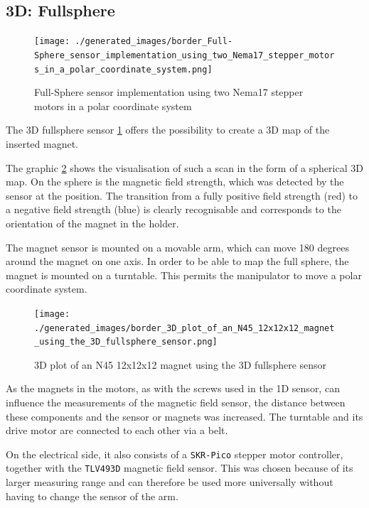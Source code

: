 \hypertarget{d-fullsphere}{%
\subsection{3D: Fullsphere}\label{d-fullsphere}}

\begin{figure}
\centering
\texttt{[image: ./generated\_images/border\_Full-Sphere\_sensor\_implementation\_using\_two\_Nema17\_stepper\_motors\_in\_a\_polar\_coordinate\_system.png]}
\caption{Full-Sphere sensor implementation using two Nema17 stepper
motors in a polar coordinate system
\label{Full-Sphere_sensor_implementation_using_two_Nema17_stepper_motors_in_a_polar_coordinate_system.png}}
\end{figure}

The 3D fullsphere sensor
\ref{Full-Sphere_sensor_implementation_using_two_Nema17_stepper_motors_in_a_polar_coordinate_system.png}
offers the possibility to create a 3D map of the inserted magnet.

The graphic
\ref{3D_plot_of_an_N45_12x12x12_magnet_using_the_3D_fullsphere_sensor.png}
shows the visualisation of such a scan in the form of a spherical 3D
map. On the sphere is the magnetic field strength, which was detected by
the sensor at the position. The transition from a fully positive field
strength (red) to a negative field strength (blue) is clearly
recognisable and corresponds to the orientation of the magnet in the
holder.

The magnet sensor is mounted on a movable arm, which can move 180
degrees around the magnet on one axis. In order to be able to map the
full sphere, the magnet is mounted on a turntable. This permits the
manipulator to move a polar coordinate system.

\begin{figure}
\centering
\texttt{[image: ./generated\_images/border\_3D\_plot\_of\_an\_N45\_12x12x12\_magnet\_using\_the\_3D\_fullsphere\_sensor.png]}
\caption{3D plot of an N45 12x12x12 magnet using the 3D fullsphere
sensor
\label{3D_plot_of_an_N45_12x12x12_magnet_using_the_3D_fullsphere_sensor.png}}
\end{figure}

As the magnets in the motors, as with the screws used in the 1D sensor,
can influence the measurements of the magnetic field sensor, the
distance between these components and the sensor or magnets was
increased. The turntable and its drive motor are connected to each other
via a belt.

On the electrical side, it also consists of a
\passthrough{\lstinline!SKR-Pico!} stepper motor controller, together
with the \passthrough{\lstinline!TLV493D!} magnetic field sensor. This
was chosen because of its larger measuring range and can therefore be
used more universally without having to change the sensor of the arm.

